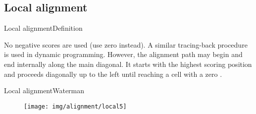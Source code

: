 \documentclass[10pt]{beamer}
\newcommand{\1}{
	\setbeamertemplate{background}{
		\texttt{[image: img/1]}
		\tikz[overlay] \fill[fill opacity=0.75,fill=white] (0,0) rectangle (-\paperwidth,\paperheight);
	}
}
\begin{document}
\subsection{Local alignment}


\begin{frame}{Local alignment}{Definition}	
	
	\begin{block}{}
		\justifying
		
		No negative scores are used (use zero instead). A similar tracing-back procedure is used in dynamic programming. However, the alignment path may begin and end internally along the main diagonal. It starts with the highest scoring position and proceeds diagonally up to the left until reaching a cell with a zero \cite{xiong2006essential}.
	\end{block}

\end{frame}

\begin{frame}{Local alignment}{Waterman}	
	\centering	
	\href{https://www.coursera.org/learn/bioinformatics-pku/lecture/eGj3d/interview-with-m-s-waterman-waterman}{}
	\begin{figure}[]
		\centering
		\texttt{[image: img/alignment/local5]}
		\label{img:uniprot}
	\end{figure}
\end{frame}
\end{document}

